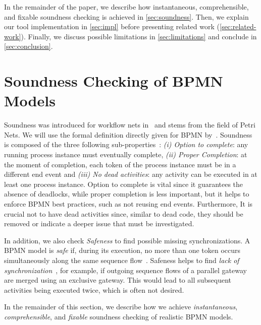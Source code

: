 \documentclass[runningheads]{llncs}
\begin{document}
In the remainder of the paper, we describe how instantaneous, comprehensible, and fixable soundness checking is achieved in \autoref{sec:soundness}.
Then, we explain our tool implementation in \autoref{sec:impl} before presenting related work (\autoref{sec:related-work}).
Finally, we discuss possible limitations in \autoref{sec:limitations} and conclude in \autoref{sec:conclusion}.

\section{Soundness Checking of BPMN Models} \label{sec:soundness}

Soundness was introduced for workflow nets in~\cite{vanderaalstApplicationPetriNets1998} and stems from the field of Petri Nets.
We will use the formal definition directly given for BPMN by~\cite{corradiniClassificationBPMNCollaborations2018}.
Soundness is composed of the three following sub-properties~\cite{corradiniClassificationBPMNCollaborations2018}:
\textit{(i) Option to complete}: any running process instance must eventually complete,
\textit{(ii) Proper Completion}: at the moment of completion, each token of the process instance must be in a different end event and
\textit{(iii) No dead activities}: any activity can be executed in at least one process instance.
Option to complete is vital since it guarantees the absence of deadlocks, while proper completion is less important, but it helps to enforce BPMN best practices, such as not reusing end events.
Furthermore, It is crucial not to have dead activities since, similar to dead code, they should be removed or indicate a deeper issue that must be investigated.

In addition, we also check \textit{Safeness} to find possible missing synchronizations.
A BPMN model is \textit{safe} if, during its execution, no more than one token occurs simultaneously along the same sequence flow~\cite{corradiniClassificationBPMNCollaborations2018}.
Safeness helps to find \textit{lack of synchronization}~\cite{fahlandAnalysisDemandInstantaneous2011}, for example, if outgoing sequence flows of a parallel gateway are merged using an exclusive gateway.
This would lead to all subsequent activities being executed twice, which is often not desired.

In the remainder of this section, we describe how we achieve \textit{instantaneous}, \textit{comprehensible}, and \textit{fixable} soundness checking of realistic BPMN models.
\end{document}
